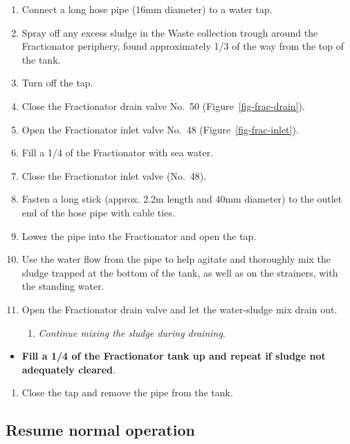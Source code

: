 \documentclass[
  12pt,
]{report}
\providecommand{\tightlist}{%
  \setlength{\itemsep}{0pt}\setlength{\parskip}{0pt}}\usepackage{longtable,booktabs,array}
\begin{document}
\begin{enumerate}
\def\labelenumi{\arabic{enumi}.}
\setcounter{enumi}{9}
\tightlist
\item
  Connect a long hose pipe (16mm diameter) to a water tap.
\item
  Spray off any excess sludge in the Waste collection trough around the
  Fractionator periphery, found approximately 1/3 of the way from the
  top of the tank.
\item
  Turn off the tap.
\item
  Close the Fractionator drain valve No.~50
  (Figure~\ref{fig-frac-drain}).
\item
  Open the Fractionator inlet valve No.~48
  (Figure~\ref{fig-frac-inlet}).
\item
  Fill a 1/4 of the Fractionator with sea water.
\item
  Close the Fractionator inlet valve (No.~48).
\item
  Fasten a long stick (approx. 2.2m length and 40mm diameter) to the
  outlet end of the hose pipe with cable ties.
\item
  Lower the pipe into the Fractionator and open the tap.
\item
  Use the water flow from the pipe to help agitate and thoroughly mix
  the sludge trapped at the bottom of the tank, as well as on the
  strainers, with the standing water.
\item
  Open the Fractionator drain valve and let the water-sludge mix drain
  out.

  \begin{enumerate}
  \def\labelenumii{\roman{enumii})}
  \tightlist
  \item
    \emph{Continue mixing the sludge during draining}.
  \end{enumerate}
\end{enumerate}

\begin{itemize}
\tightlist
\item
  \textbf{Fill a 1/4 of the Fractionator tank up and repeat if sludge
  not adequately cleared}.
\end{itemize}

\begin{enumerate}
\def\labelenumi{\arabic{enumi}.}
\setcounter{enumi}{20}
\tightlist
\item
  Close the tap and remove the pipe from the tank.
\end{enumerate}

\hypertarget{sec-foam-resume}{%
\subsection{Resume normal operation}\label{sec-foam-resume}}
\end{document}
